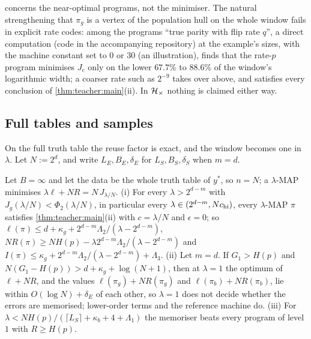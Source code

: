 \begin{remark}\label{rem:teacher:selected}
 concerns the near-optimal programs, not the minimiser. The natural strengthening that $\pi_g$ is a vertex of the population hull on the whole window fails in explicit rate codes: among the programs ``true parity with flip rate $q$'', a direct computation (code in the accompanying repository) at the example's sizes, with the machine constant set to $0$ or $30$ (an illustration), finds that the rate-$p$ program minimises $J_c$ only on the lower $67.7\%$ to $88.6\%$ of the window's logarithmic width; a coarser rate such as $2^{-9}$ takes over above, and satisfies every conclusion of \cref{thm:teacher:main}(ii). In $\mathcal{H}_{\times}$ nothing is claimed either way.
\end{remark}

\subsection{Full tables and samples}\label{sec:teacher:more}

On the full truth table the reuse factor is exact, and the window becomes one in $\lambda$. Let $N:=2^d$, and write $L_E,B_E,\delta_E$ for $L_S,B_S,\delta_S$ when $m=d$.

\begin{corollary}\label{cor:teacher:fulltable}
Let $B=\infty$ and let the data be the whole truth table of $y^*$, so $n=N$; a $\lambda$-MAP minimises $\lambda\ell+NR=N\,J_{\lambda/N}$.
(i) For every $\lambda>2^{d-m}$ with $J_g(\lambda/N)<\Phi_2(\lambda/N)$, in particular every $\lambda\in(2^{d-m},Nc_{\rm hi})$, every $\lambda$-MAP $\pi$ satisfies \cref{thm:teacher:main}(ii) with $c=\lambda/N$ and $\epsilon=0$; so $\ell(\pi)\le d+\kappa_g+2^{d-m}\Lambda_2/(\lambda-2^{d-m})$, $NR(\pi)\ge NH(p)-\lambda2^{d-m}\Lambda_2/(\lambda-2^{d-m})$ and $I(\pi)\le\kappa_g+2^{d-m}\Lambda_2/(\lambda-2^{d-m})+\Lambda_3$.
(ii) Let $m=d$. If $G_1>H(p)$ and $N(G_1-H(p))>d+\kappa_g+\log(N+1)$, then at $\lambda=1$ the optimum of $\ell+NR$, and the values $\ell(\pi_g)+NR(\pi_g)$ and $\ell(\pi_b)+NR(\pi_b)$, lie within $O(\log N)+\delta_E$ of each other, so $\lambda=1$ does not decide whether the errors are memorised; lower-order terms and the reference machine do.
(iii) For $\lambda<NH(p)/(\lceil L_S\rceil+\kappa_b+4+\Lambda_1)$ the memoriser beats every program of level $1$ with $R\ge H(p)$.
\end{corollary}


